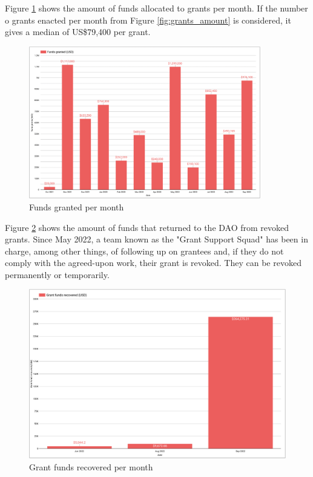 \documentclass[MSE,Master,english]{twbook}%
\begin{document}
Figure \ref{fig:funds_granted} shows the amount of funds allocated to grants per month. If the number o grants enacted per month from Figure \ref{fig:grants_amount} is considered, it gives a median of US\$79,400 per grant.
\begin{figure}[H]
  \centering
  \includegraphics[width=0.9\textwidth]{metrics/funds_granted.png}
  \caption{Funds granted per month}
  \label{fig:funds_granted}
\end{figure}

Figure \ref{fig:funds_recovered} shows the amount of funds that returned to the \gls{DAO} from revoked grants. Since May 2022, a team known as the "Grant Support Squad" has been in charge, among other things, of following up on grantees and, if they do not comply with the agreed-upon work, their grant is revoked. They can be revoked permanently or temporarily.
\begin{figure}[H]
  \centering
  \includegraphics[width=\textwidth]{metrics/funds_recovered.png}
  \caption{Grant funds recovered per month}
  \label{fig:funds_recovered}
\end{figure}
\end{document}
